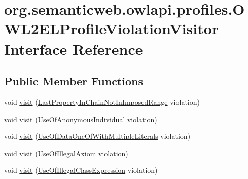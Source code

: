 \hypertarget{interfaceorg_1_1semanticweb_1_1owlapi_1_1profiles_1_1_o_w_l2_e_l_profile_violation_visitor}{\section{org.\-semanticweb.\-owlapi.\-profiles.\-O\-W\-L2\-E\-L\-Profile\-Violation\-Visitor Interface Reference}
\label{interfaceorg_1_1semanticweb_1_1owlapi_1_1profiles_1_1_o_w_l2_e_l_profile_violation_visitor}
}
\subsection*{Public Member Functions}
\begin{DoxyCompactItemize}
\item 
void \hyperlink{interfaceorg_1_1semanticweb_1_1owlapi_1_1profiles_1_1_o_w_l2_e_l_profile_violation_visitor_abe5abfed7ab187740c65190ec0136fc3}{visit} (\hyperlink{classorg_1_1semanticweb_1_1owlapi_1_1profiles_1_1_last_property_in_chain_not_in_imposed_range}{Last\-Property\-In\-Chain\-Not\-In\-Imposed\-Range} violation)
\item 
void \hyperlink{interfaceorg_1_1semanticweb_1_1owlapi_1_1profiles_1_1_o_w_l2_e_l_profile_violation_visitor_ac4f014ca66348fb6135b5297354803b7}{visit} (\hyperlink{classorg_1_1semanticweb_1_1owlapi_1_1profiles_1_1_use_of_anonymous_individual}{Use\-Of\-Anonymous\-Individual} violation)
\item 
void \hyperlink{interfaceorg_1_1semanticweb_1_1owlapi_1_1profiles_1_1_o_w_l2_e_l_profile_violation_visitor_a9cd111c05cd78029a30195b6b99d5926}{visit} (\hyperlink{classorg_1_1semanticweb_1_1owlapi_1_1profiles_1_1_use_of_data_one_of_with_multiple_literals}{Use\-Of\-Data\-One\-Of\-With\-Multiple\-Literals} violation)
\item 
void \hyperlink{interfaceorg_1_1semanticweb_1_1owlapi_1_1profiles_1_1_o_w_l2_e_l_profile_violation_visitor_a10c8ed800228aba7bb2e0aadcb8a59e6}{visit} (\hyperlink{classorg_1_1semanticweb_1_1owlapi_1_1profiles_1_1_use_of_illegal_axiom}{Use\-Of\-Illegal\-Axiom} violation)
\item 
void \hyperlink{interfaceorg_1_1semanticweb_1_1owlapi_1_1profiles_1_1_o_w_l2_e_l_profile_violation_visitor_a07d92d48b28bf72f0bc11c73b2ffc555}{visit} (\hyperlink{classorg_1_1semanticweb_1_1owlapi_1_1profiles_1_1_use_of_illegal_class_expression}{Use\-Of\-Illegal\-Class\-Expression} violation)

\end{DoxyCompactItemize}
